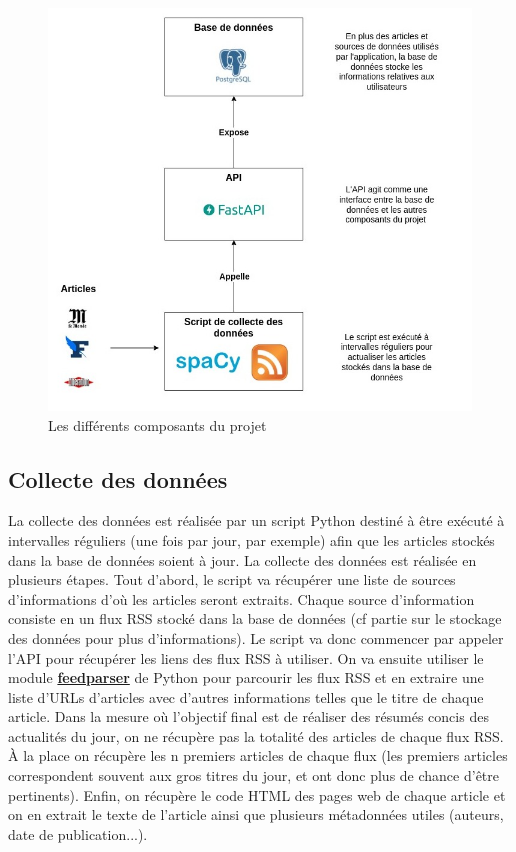 \documentclass[french]{article}
\begin{document}
    \begin{figure}[h]
        \includegraphics[width=12cm]{composants}
        \centering
        \caption{Les différents composants du projet}
        \centering
    \end{figure}

    \subsection{Collecte des données}
    La collecte des données est réalisée par un script Python destiné à être exécuté à intervalles réguliers (une fois par jour, par exemple) afin que les articles stockés dans la base de données soient à jour.
    La collecte des données est réalisée en plusieurs étapes. Tout d'abord, le script va récupérer une liste de sources d'informations d'où les articles seront extraits. Chaque source d'information consiste en un flux RSS stocké dans la base de données (cf partie sur le stockage des données pour plus d'informations). Le script va donc commencer par appeler l'API pour récupérer les liens des flux RSS à utiliser.
    On va ensuite utiliser le module \textbf{\href{https://pypi.org/project/feedparser/}{feedparser}} de Python pour parcourir les flux RSS et en extraire une liste d'URLs d'articles avec d'autres informations telles que le titre de chaque article. Dans la mesure où l'objectif final est de réaliser des résumés concis des actualités du jour, on ne récupère pas la totalité des articles de chaque flux RSS. À la place on récupère les n premiers articles de chaque flux (les premiers articles correspondent souvent aux gros titres du jour, et ont donc plus de chance d'être pertinents).
    Enfin, on récupère le code HTML des pages web de chaque article et on en extrait le texte de l'article ainsi que plusieurs métadonnées utiles (auteurs, date de publication...). 
\end{document}
